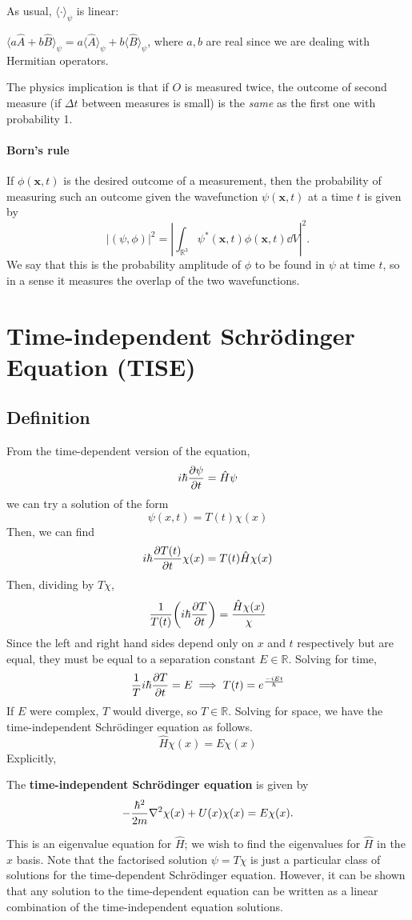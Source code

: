 \documentclass[a4paper,11pt]{article}
\begin{document}
As usual, $ \langle \cdot \rangle_{\psi} $ is linear: 
\begin{proposition}
    $ \langle a \hat{A}+ b\hat B \rangle_{\psi} = a \langle \hat A\rangle _{\psi} + b \langle\hat B\rangle_{\psi} $, where $a,b$ are real since we are dealing with Hermitian operators.
\end{proposition}

The physics implication is that if $O$ is measured twice, the outcome of second measure (if $\Delta t$ between measures is small) is the \textit{same} as the first one with probability 1. 

\paragraph{Born's rule} If $\phi(\mathbf{x}, t)$ is the desired outcome of a measurement, then the probability of measuring such an outcome given the wavefunction $\psi(\mathbf{x}, t)$ at a time $t$ is given by
\[
|(\psi, \phi)|^2=\left|\int_{\mathbb{R}^3} \psi^*(\mathbf{x}, t) \phi(\mathbf{x}, t) \dd V\right|^2 .
\]
We say that this is the probability amplitude of $\phi$ to be found in $\psi$ at time $t$, so in a sense it measures the overlap of the two wavefunctions.

\section{Time-independent Schr\"odinger Equation (TISE)}
\subsection{Definition}
From the time-dependent version of the equation,
\[
	i\hbar \pdv{\psi}{t} = \hat H \psi
\]
we can try a solution of the form
\[
	\psi(x,t) = T(t) \chi(x)
\]
Then, we can find
\[
	i \hbar \pdv{T(t)}{t} \chi(x) = T(t) \hat H \chi(x)
\]
Then, dividing by \( T \chi \),
\[
	\frac{1}{T(t)} \qty(i \hbar \pdv{T}{t}) = \frac{\hat H \chi(x)}{\chi}
\]
Since the left and right hand sides depend only on \( x \) and \( t \) respectively but are equal, they must be equal to a separation constant \( E \in \mathbb R \).
Solving for time,
\[
	\frac{1}{T} i \hbar \pdv{T}{t} = E \implies T(t) = e^{\frac{-i Et}{\hbar}}
\]
If \( E \) were complex, \( T \) would diverge, so $T\in \mathbb{R}$.
Solving for space, we have the time-independent Schr\"odinger equation as follows.
\[
	\hat H \chi(x) = E \chi(x)
\]
Explicitly,
\begin{definition}
    The \textbf{time-independent Schr\"odinger equation} is given by 
    \[
	-\frac{\hbar^2}{2m} \laplacian{\chi(x)} + U(x) \chi(x) = E \chi(x).
\]
\end{definition}
This is an eigenvalue equation for \( \hat H \); we wish to find the eigenvalues for \( \hat H \) in the \( x \) basis.
Note that the factorised solution \( \psi = T \chi \) is just a particular class of solutions for the time-dependent Schr\"odinger equation.
However, it can be shown that any solution to the time-dependent equation can be written as a linear combination of the time-independent equation solutions.
\end{document}

